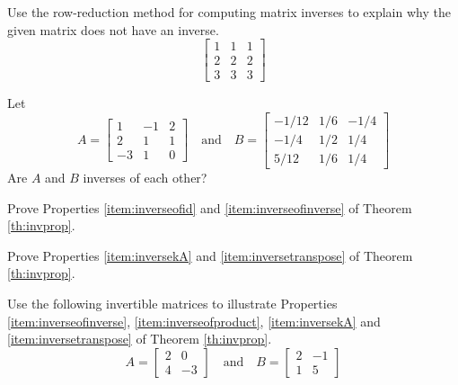 \documentclass{ximera}
\begin{document}
\begin{problem}\label{prob:inverseofsingularmatrix}
Use the row-reduction method for computing matrix inverses to explain why the given matrix does not have an inverse.
$$\begin{bmatrix}1&1&1\\2&2&2\\3&3&3\end{bmatrix}$$
\end{problem}

\begin{problem}\label{prob:inversesofeachother} Let $$A=\begin{bmatrix}1&-1&2\\2&1&1\\-3&1&0\end{bmatrix}\quad\text{and}\quad B=\begin{bmatrix}-1/12&1/6&-1/4\\-1/4&1/2&1/4\\5/12&1/6&1/4\end{bmatrix}$$ Are $A$ and $B$ inverses of each other?

\begin{multipleChoice}
\end{multipleChoice}
\end{problem}



\begin{problem}\label{prob:oroveinverseofid}
Prove Properties \ref{item:inverseofid} and \ref{item:inverseofinverse} of Theorem \ref{th:invprop}.
\end{problem}

\begin{problem}\label{prob:proveinverseka}
Prove Properties \ref{item:inversekA} and \ref{item:inversetranspose} of Theorem \ref{th:invprop}.
\end{problem}

\begin{problem}\label{prob:illustratematinverse} Use the following invertible matrices to illustrate Properties \ref{item:inverseofinverse}, \ref{item:inverseofproduct}, \ref{item:inversekA} and \ref{item:inversetranspose} of Theorem \ref{th:invprop}.
$$A=\begin{bmatrix}2&0\\4&-3\end{bmatrix}\quad\text{and}\quad B=\begin{bmatrix}2&-1\\1&5\end{bmatrix}$$
\end{problem}
\end{document}
